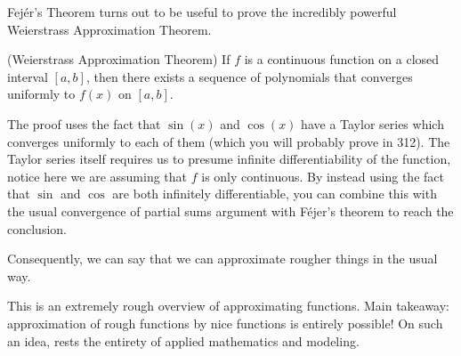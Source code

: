 \documentclass{ximera}
\begin{document}
Fej{\'e}r's Theorem turns out to be useful to prove the incredibly powerful Weierstrass Approximation Theorem.

\begin{theorem}{(Weierstrass Approximation Theorem)}
    If $f$ is a continuous function on a closed interval $[a,b]$, then there exists a sequence of polynomials that converges uniformly to $f(x)$ on $[a,b]$.
\end{theorem}
The proof uses the fact that $\sin(x)$ and $\cos(x)$ have a Taylor series which converges uniformly to each of them (which you will probably prove in 312).  The Taylor series itself requires us to presume infinite differentiability of the function, notice here we are assuming that $f$ is only continuous.  By instead using the fact that $\sin$ and $\cos$ are both infinitely differentiable, you can combine this with the usual convergence of partial sums argument with F{\'e}jer's theorem to reach the conclusion.

Consequently, we can say that we can approximate rougher things in the usual way. 

This is an extremely rough overview of approximating functions.  Main takeaway: approximation of rough functions by nice functions is entirely possible!  On such an idea, rests the entirety of applied mathematics and modeling.
\end{document}

